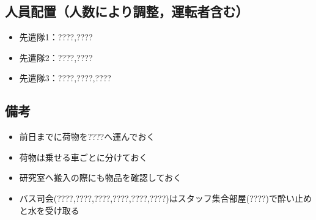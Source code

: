 \subsection{人員配置（人数により調整，運転者含む）}
\begin{itemize}
\item 先遣隊1：????,????
\item 先遣隊2：????,????
\item 先遣隊3：????,????,????     %

\end{itemize}

\subsection{備考}
\begin{itemize}
\item 前日までに荷物を????へ運んでおく
\item 荷物は乗せる車ごとに分けておく
\item 研究室へ搬入の際にも物品を確認しておく
\item バス司会(????,????,????,????,????,????)はスタッフ集合部屋(????)で酔い止めと水を受け取る
\end{itemize}


%
